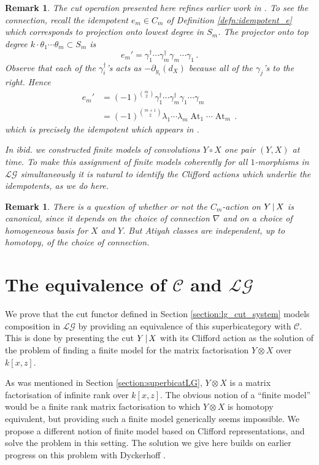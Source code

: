 \documentclass[english,letter paper,12pt,leqno]{article}
\theoremstyle{example}
\newtheorem{remark}[theorem]{Remark}
\numberwithin{equation}{section}
\def\LG{\mathcal{LG}}
\def\L{\mathcal{C}}
\def\ferm{\gamma}
\def\fermc{\gamma^\dagger}
\DeclareMathOperator{\At}{At}
\begin{document}
\begin{remark}\label{remark:relation_to_toby_paper} The cut operation presented here refines earlier work in \cite{dm1102.2957}. To see the connection, recall the idempotent $e_m \in C_m$ of Definition \ref{defn:idempotent_e} which corresponds to projection onto lowest degree in $S_m$. The projector onto top degree $k \cdot \theta_1 \cdots \theta_m \subset S_m$ is 
\[
e_m' = \fermc_1 \cdots \fermc_m \ferm_m \cdots \ferm_1\,.
\]
Observe that each of the $\fermc_i$'s acts as $- \partial_{y_i}(d_X)$ because all of the $\ferm_j$'s to the right. Hence
\begin{align*}
e_m' &= (-1)^{\binom{m}{2}} \fermc_1 \cdots \fermc_m \ferm_1 \cdots \ferm_m \\
&= (-1)^{\binom{m+1}{2}} \lambda_1 \cdots \lambda_m \At_1 \cdots \At_m\,.
\end{align*}
which is precisely the idempotent which appears in \cite[Corollary 10.4]{dm1102.2957}.

In \emph{ibid.} we constructed finite models of convolutions $Y \circ X$ one pair $(Y,X)$ at time. To make this assignment of finite models coherently for all $1$-morphisms in $\LG$ simultaneously it is natural to identify the Clifford actions which underlie the idempotents, as we do here.
\end{remark}

\begin{remark} There is a question of whether or not the $C_m$-action on $Y \,|\, X$ is canonical, since it depends on the choice of connection $\nabla$ and on a choice of homogeneous basis for $X$ and $Y$. But Atiyah classes are independent, up to homotopy, of the choice of connection.
\end{remark}

\section{The equivalence of $\L$ and $\LG$}\label{section:equivllg}

We prove that the cut functor defined in Section \ref{section:lg_cut_system} models composition in $\LG$ by providing an equivalence of this superbicategory with $\L$. This is done by presenting the cut $Y \,|\, X$ with its Clifford action as the solution of the problem of finding a finite model for the matrix factorisation $Y \otimes X$ over $k[x,z]$.

As was mentioned in Section \ref{section:superbicatLG}, $Y \otimes X$ is a matrix factorisation of infinite rank over $k[x,z]$. The obvious notion of a ``finite model'' would be a finite rank matrix factorisation to which $Y \otimes X$ is homotopy equivalent, but providing such a finite model generically seems impossible. We propose a different notion of finite model based on Clifford representations, and solve the problem in this setting. The solution we give here builds on earlier progress on this problem with Dyckerhoff \cite{dm1102.2957}. 
\end{document}
